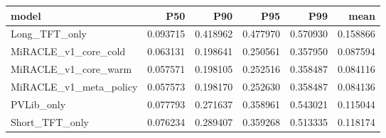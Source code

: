 \begin{tabular}{lrrrrr}
\toprule
model & P50 & P90 & P95 & P99 & mean \\
\midrule
Long_TFT_only & 0.093715 & 0.418962 & 0.477970 & 0.570930 & 0.158866 \\
MiRACLE_v1_core_cold & 0.063131 & 0.198641 & 0.250561 & 0.357950 & 0.087594 \\
MiRACLE_v1_core_warm & 0.057571 & 0.198105 & 0.252516 & 0.358487 & 0.084116 \\
MiRACLE_v1_meta_policy & 0.057573 & 0.198170 & 0.252630 & 0.358487 & 0.084136 \\
PVLib_only & 0.077793 & 0.271637 & 0.358961 & 0.543021 & 0.115044 \\
Short_TFT_only & 0.076234 & 0.289407 & 0.359268 & 0.513335 & 0.118174 \\
\bottomrule
\end{tabular}
